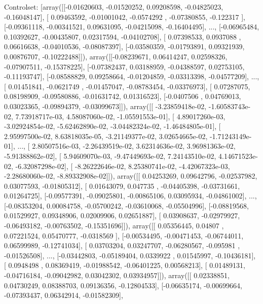 \documentclass{article}
\begin{document}
Controlset: [array([[-0.01620603, -0.01520252,  0.09208598, -0.04825023, -0.16048147],
       [ 0.09463592, -0.01001042, -0.0574292 , -0.07380855, -0.122317  ],
       [-0.09361118, -0.00341521,  0.09631095, -0.04215098, -0.16404495],
       ..., 
       [-0.06965484,  0.10392627, -0.00435807,  0.02317594, -0.04102708],
       [ 0.07398533,  0.0937088 ,  0.06616638, -0.04010536, -0.08087397],
       [-0.03580359, -0.01793891,  0.09321939,  0.00876707, -0.10222488]]), array([[-0.08239671,  0.06414247,  0.02598326, -0.07907511, -0.15378225],
       [-0.07382437,  0.03188959, -0.04388597,  0.02753105, -0.11193747],
       [-0.08588829,  0.09258664, -0.01204859, -0.03313398, -0.04577209],
       ..., 
       [ 0.01451841, -0.0621749 , -0.01457047, -0.08783454, -0.03376973],
       [ 0.07287075,  0.08198909, -0.09580886, -0.01631742,  0.01316523],
       [-0.0407506 ,  0.04769013,  0.03023365, -0.09894379, -0.03099673]]), array([[ -3.23859418e-02,  -1.60583743e-02,   7.73918717e-03,
          4.58087060e-02,  -1.05591553e-01],
       [  4.89017260e-03,  -3.02924854e-02,  -5.62462890e-02,
         -3.04482324e-02,  -1.46484805e-01],
       [  2.95997500e-02,   8.63818035e-05,  -3.21149377e-02,
          3.02654665e-02,  -1.71243149e-01],
       ..., 
       [  2.80507516e-03,  -2.26439519e-02,   3.62314636e-02,
          3.96981363e-02,  -5.91388862e-02],
       [  5.94609070e-03,  -9.47449693e-02,   7.24143510e-02,
          4.14671523e-02,  -6.32087298e-02],
       [ -8.26222646e-02,   8.25380741e-02,  -4.42067323e-03,
         -2.28680060e-02,  -8.89332908e-02]]), array([[ 0.04253269,  0.09642796, -0.02537982,  0.03077593, -0.01805312],
       [ 0.01643079,  0.047735  , -0.04405398, -0.03731661,  0.01264725],
       [-0.09577391, -0.09025801, -0.00865106,  0.03095934, -0.04861002],
       ..., 
       [-0.08353204,  0.00084758, -0.05700242, -0.03610068, -0.05504996],
       [-0.08819568,  0.01529927,  0.09348906,  0.02009906,  0.02651887],
       [ 0.03908637, -0.02979927, -0.06493182, -0.00763502, -0.15351696]]), array([[ 0.05356445,  0.04807   ,  0.07221524,  0.05470777, -0.0318569 ],
       [-0.00534495, -0.00471453, -0.06744011,  0.06599989, -0.12741034],
       [ 0.03703204,  0.03247707, -0.06280567, -0.095981  , -0.01526508],
       ..., 
       [-0.03442803, -0.05189404,  0.0339922 ,  0.01545997, -0.10436181],
       [ 0.0948498 ,  0.08369419, -0.01988542, -0.06401225,  0.00568213],
       [ 0.01489131, -0.04716184, -0.09042982,  0.03042302,  0.03934957]]), array([[ 0.02338851,  0.04730249,  0.08388703,  0.09136356, -0.12804533],
       [-0.06635174, -0.00699664, -0.07393437,  0.06342914, -0.01582309],
\end{document}
